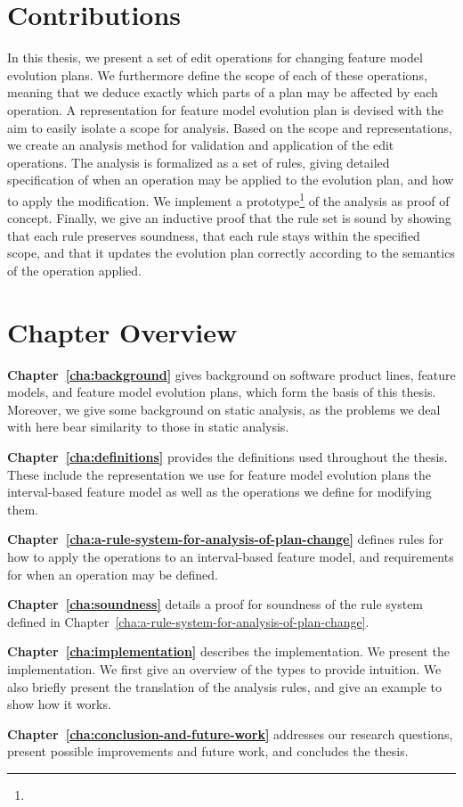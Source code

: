 \section{Contributions}

In this thesis, we present a set of edit operations for changing feature model evolution plans. We furthermore define the scope of each of these operations, meaning that we deduce exactly which parts of a plan may be affected by each operation. A representation for feature model evolution plan is devised with the aim to easily isolate a scope for analysis. Based on the scope and representations, we create an analysis method for validation and application of the edit operations. The analysis is formalized as a set of rules, giving detailed specification of when an operation may be applied to the evolution plan, and how to apply the modification. We implement a prototype\footnote{} of the analysis as proof of concept. Finally, we give an inductive proof that the rule set is sound by showing that each rule preserves soundness, that each rule stays within the specified scope, and that it updates the evolution plan correctly according to the semantics of the operation applied.

\section{Chapter Overview}
\label{sec:chapter-overview}

\textbf{Chapter~\ref{cha:background}} gives background on software product lines, feature models, and feature model evolution plans, which form the basis of this thesis. Moreover, we give some background on static analysis, as the problems we deal with here bear similarity to those in static analysis.

\textbf{Chapter~\ref{cha:definitions}} provides the definitions used throughout the thesis. These include the representation we use for feature model evolution plans \textemdash{} the interval-based feature model \textemdash{} as well as the operations we define for modifying them. 

\textbf{Chapter~\ref{cha:a-rule-system-for-analysis-of-plan-change}} defines rules for how to apply the operations to an interval-based feature model, and requirements for when an operation may be defined.

\textbf{Chapter~\ref{cha:soundness}} details a proof for soundness of the rule system defined in Chapter~\vref{cha:a-rule-system-for-analysis-of-plan-change}.

\textbf{Chapter~\ref{cha:implementation}} describes the implementation. We present the implementation. We first give an overview of the types to provide intuition. We also briefly present the translation of the analysis rules, and give an example to show how it works.

\textbf{Chapter~\ref{cha:conclusion-and-future-work}} addresses our research questions, present possible improvements and future work, and concludes the thesis.
